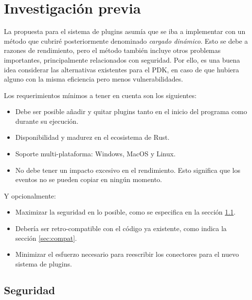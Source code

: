 
\chapter{Investigación previa}\label{sec:investigation}

La propuesta para el sistema de plugins asumía que se iba a implementar con un
método que cubriré posteriormente denominado \emph{cargado dinámico}. Esto se
debe a razones de rendimiento, pero el método también incluye otros problemas
importantes, principalmente relacionados con seguridad. Por ello, es una buena
idea considerar las alternativas existentes para el PDK, en caso de que hubiera
alguno con la misma eficiencia pero menos vulnerabilidades.

Los requerimientos mínimos a tener en cuenta son los siguientes:

\begin{itemize}
    \item Debe ser posible añadir y quitar plugins tanto en el inicio del
        programa como durante su ejecución.

    \item Disponibilidad y madurez en el ecosistema de Rust.

    \item Soporte multi-plataforma: Windows, MacOS y Linux.

    \item No debe tener un impacto excesivo en el rendimiento. Esto significa
        que los eventos no se pueden copiar en ningún momento.

\end{itemize}

Y opcionalmente:

\begin{itemize}
    \item Maximizar la seguridad en lo posible, como se especifica en la sección
        \ref{sec:security}.

    \item Debería ser retro-compatible con el código ya existente, como indica la
        sección \ref{sec:compat}.

    \item Minimizar el esfuerzo necesario para reescribir los conectores para el
        nuevo sistema de plugins.

\end{itemize}

\section{Seguridad}\label{sec:security}

